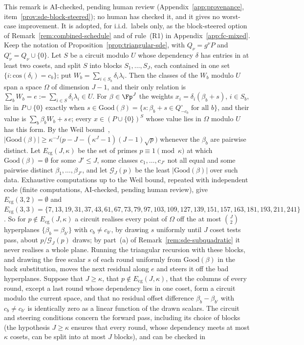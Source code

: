 \begin{remark}
\label{rem:sde-block-steered}
This remark is AI-checked, pending human review (Appendix~\ref{app:provenance}, item~\ref{prov:sde-block-steered}); no human has checked it, and it gives no worst-case improvement. It is adopted, for i.i.d.\ labels only, as the block-steered option of Remark~\ref{rem:combined-schedule} and of rule~(R1) in Appendix~\ref{app:fc-mixed}. Keep the notation of Proposition~\ref{prop:triangular-sde}, with $Q_\nu=g^{\nu}P$ and $Q_\nu^\circ=Q_\nu\cup\{0\}$. Let $S$ be a circuit modulo $U$ whose dependency $\delta$ has entries in at least two cosets, and split $S$ into blocks $S_1,\dots,S_J$, each contained in one set $\{i:\mathrm{cos}(\delta_i)=c_b\}$; put $W_b=\sum_{i\in S_b}\delta_i\lambda_i$. Then the classes of the $W_b$ modulo $U$ span a space $\Omega$ of dimension $J-1$, and their only relation is $\sum_bW_b=e:=\sum_{i\in S}\delta_i\lambda_i\in U$. For $\beta\in\Fp^J$ the weights $x_i=\delta_i(\beta_b+s)$, $i\in S_b$, lie in $P\cup\{0\}$ exactly when $s\in\mathrm{Good}(\beta)=\{s:\beta_b+s\in Q_{-c_b}^\circ\text{ for all }b\}$, and their value is $\sum_b\beta_bW_b+s\,e$; every $x\in(P\cup\{0\})^S$ whose value lies in $\Omega$ modulo $U$ has this form. By the Weil bound~\cite[Theorem~5.41]{LidlNiederreiter1997}, $|\mathrm{Good}(\beta)|\ge\kappa^{-J}\bigl(p-J-(\kappa^J-1)(J-1)\sqrt p\bigr)$ whenever the $\beta_b$ are pairwise distinct. Let $E_{\mathrm{cg}}(J,\kappa)$ be the set of primes $p\equiv1\pmod\kappa$ at which $\mathrm{Good}(\beta)=\emptyset$ for some $J'\le J$, some classes $c_1,\dots,c_{J'}$ not all equal and some pairwise distinct $\beta_1,\dots,\beta_{J'}$, and let $\mathcal{G}_J(p)$ be the least $|\mathrm{Good}(\beta)|$ over such data. Exhaustive computations up to the Weil bound, repeated with independent code (finite computations, AI-checked, pending human review), give $E_{\mathrm{cg}}(3,2)=\emptyset$ and $E_{\mathrm{cg}}(3,3)=\{7,13,19,31,37,43,61,67,73,79,97,103,109,127,139,151,157,163,181,193,211,241\}$. So for $p\notin E_{\mathrm{cg}}(J,\kappa)$ a circuit realises every point of $\Omega$ off the at most $\binom{J}{2}$ hyperplanes $\{\beta_b=\beta_{b'}\}$ with $c_b\ne c_{b'}$, by drawing $s$ uniformly until $J$ coset tests pass, about $p/\mathcal{G}_J(p)$ draws; by part~(a) of Remark~\ref{rem:sde-subquadratic} it never realises a whole plane. Running the triangular recursion with these blocks, and drawing the free scalar $s$ of each round uniformly from $\mathrm{Good}(\beta)$ in the back substitution, moves the next residual along $e$ and steers it off the bad hyperplanes. Suppose that $J\ge\kappa$, that $p\notin E_{\mathrm{cg}}(J,\kappa)$, that the columns of every round, except a last round whose dependency lies in one coset, form a circuit modulo the current space, and that no residual offset difference $\beta_b-\beta_{b'}$ with $c_b\ne c_{b'}$ is identically zero as a linear function of the drawn scalars. The circuit and steering conditions concern the forward pass, including its choice of blocks (the hypothesis $J\ge\kappa$ ensures that every round, whose dependency meets at most $\kappa$ cosets, can be split into at most $J$ blocks), and can be checked in 
\end{remark}
